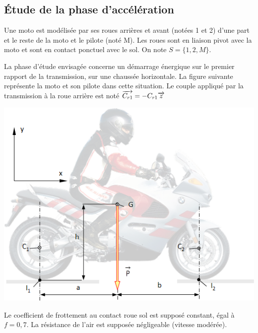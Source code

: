 \documentclass[10pt,fleqn]{article} %
\begin{document}
\def\pathfig{images}

\vspace{4.5cm}
\pagestyle{fancy}
\thispagestyle{plain}

\def\columnseprulecolor{\color{ocre}}
\setlength{\columnseprule}{0.4pt} 

\def\pathfig{images}

\ifprof
\else
\begin{multicols}{2}
\fi


\subsection*{Étude de la phase d’accélération}
\setcounter{subparagraph}{0}
Une moto est modélisée par ses roues arrières et avant (notées 1 et 2) d'une part et le reste de la moto et le pilote (noté M). Les roues sont en liaison pivot avec la moto et sont en contact ponctuel avec le sol. On note $S=\{1,2,M\}$.

La phase d’étude envisagée concerne un démarrage énergique sur le premier rapport de la transmission, sur une chaussée horizontale. La figure suivante représente la moto et son pilote dans cette situation. Le couple appliqué par la transmission à la roue arrière est noté $\overrightarrow{C_{r1}}=-C_{r1}\overrightarrow{z}$


\begin{center}
\includegraphics[width=\linewidth]{images/fig_02}
\end{center}


Le coefficient de frottement au contact roue sol est supposé constant, égal à $f=0,7$. La résistance de l’air est supposée négligeable (vitesse modérée).


\end{multicols}
\end{document}
